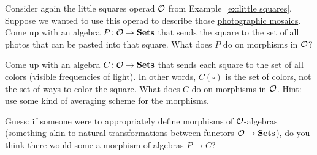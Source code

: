 \documentclass[CT4S-EN-RU]{subfiles}
\begin{document}
\begin{applicationRUS}
\end{applicationRUS}

\begin{exerciseENG}
Consider again the little squares operad $\mathcal{O}$ from Example~\ref{ex:little squares}. Suppose we wanted to use this operad to describe those \href{http://en.wikipedia.org/wiki/Photographic_mosaic}{\text photographic mosaics}. 
\sexc Come up with an algebra $P\colon\mathcal{O}\rightarrow{\mathbf{Sets}}$ that sends the square to the set of all photos that can be pasted into that square. What does $P$ do on morphisms in $\mathcal{O}$?
\item Come up with an algebra $C\colon\mathcal{O}\rightarrow{\mathbf{Sets}}$ that sends each square to the set of all colors (visible frequencies of light). In other words, $C(\square)$ is the set of colors, not the set of ways to color the square. What does $C$ do on morphisms in $\mathcal{O}$. Hint: use some kind of averaging scheme for the morphisms.
\item Guess: if someone were to appropriately define morphisms of $\mathcal{O}$-algebras (something akin to natural transformations between functors $\mathcal{O}\rightarrow{\mathbf{Sets}}$), do you think there would some a morphism of algebras $P\to C$?
\endsexc
\end{exerciseENG}

\begin{exerciseRUS}
\end{exerciseRUS}


\subsubsection{}
\end{document}
